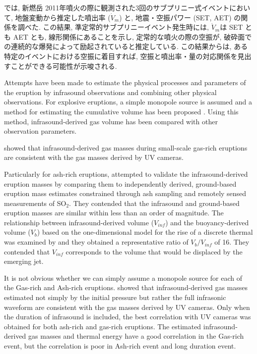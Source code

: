 \documentclass[12pt]{article}
\begin{document}
\cite{Ichihara2016a}では, 新燃岳 2011年噴火の際に観測された3回のサブプリニー式イベントにおいて, 地盤変動から推定した噴出率 ($\dot{V}_m$) と, 地震・空振パワー (SET, AET) の関係を調べた. この結果, 準定常的サブプリニーイベント発生時には, $\dot{V}_m$は SET とも AET とも, 線形関係にあることを示し, 定常的な噴火の際の空振が, 破砕面での連続的な爆発によって励起されていると推定している. この結果からは, ある特定のイベントにおける空振に着目すれば, 空振と噴出率・量の対応関係を見出すことができる可能性が示唆される.

Attempts have been made to estimate the physical processes and parameters of the eruption by infrasound observations and combining other physical observations.
For explosive eruptions, a simple monopole source is assumed \citep{Lighthill1978} and a method for estimating the cumulative volume has been proposed \citep{Johnson 2003}. 
Using this method, infrasound-derived gas volume has been compared with other observation parameters.

\cite{Dalton2010} showed that infrasound-derived gas masses during small-scale gas-rich eruptions are consistent with the gas masses derived by UV cameras.

Particularly for ash-rich eruptions, \cite{Fee2017a} attempted to validate the infrasound-derived eruption masses by comparing them to independently derived, ground-based eruption mass estimates constrained through ash sampling and remotely sensed measurements of SO$_2$. They contended that the infrasound and ground-based eruption masses are similar within less than an order of magnitude.
The relationship between infrasound-derived volume ($V_{inf}$) and the buoyancy-derived volume ($V_{b}$) based on the one-dimensional model for the rise of a discrete thermal was examined by \cite{Yamada2018b} and they obtained a representative ratio of $V_{b}/V_{inf}$ of 16. 
They contended that $V_{inf}$ corresponds to the volume that would be displaced by the emerging jet.

It is not obvious whether we can simply assume a monopole source for each of the Gas-rich and Ash-rich eruptions.
\cite{DelleDonne2016} showed that infrasound-derived gas masses estimated not simply by the initial pressure but rather the full infrasonic waveform are consistent with the gas masses derived by UV cameras. 
Only when the duration of infrasound is included, the best correlation with UV cameras was obtained for both ash-rich and gas-rich eruptions. The estimated infrasound-derived gas masses and thermal energy have a good correlation in the Gas-rich event, but the correlation is poor in Ash-rich event and long duration event.
\end{document}
